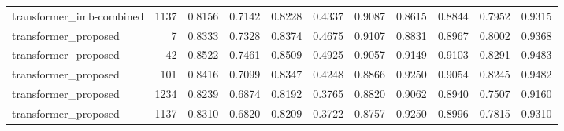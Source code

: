 \begin{table}
\begin{tabular}{lrrrrrrrrrr}
transformer\_imb-combined & 1137 & 0.8156 & 0.7142 & 0.8228 & 0.4337 & 0.9087 & 0.8615 & 0.8844 & 0.7952 & 0.9315 \\
transformer\_proposed & 7 & 0.8333 & 0.7328 & 0.8374 & 0.4675 & 0.9107 & 0.8831 & 0.8967 & 0.8002 & 0.9368 \\
transformer\_proposed & 42 & 0.8522 & 0.7461 & 0.8509 & 0.4925 & 0.9057 & 0.9149 & 0.9103 & 0.8291 & 0.9483 \\
transformer\_proposed & 101 & 0.8416 & 0.7099 & 0.8347 & 0.4248 & 0.8866 & 0.9250 & 0.9054 & 0.8245 & 0.9482 \\
transformer\_proposed & 1234 & 0.8239 & 0.6874 & 0.8192 & 0.3765 & 0.8820 & 0.9062 & 0.8940 & 0.7507 & 0.9160 \\
transformer\_proposed & 1137 & 0.8310 & 0.6820 & 0.8209 & 0.3722 & 0.8757 & 0.9250 & 0.8996 & 0.7815 & 0.9310 \\
\bottomrule
\end{tabular}
\end{table}
